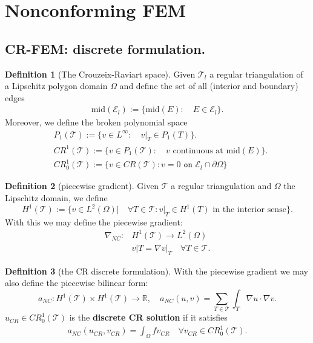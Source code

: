 \documentclass[a4paper,12pt,oneside,fleqn]{book}
\theoremstyle{definition}
\newtheorem{definition}{Definition}[section]
\theoremstyle{remark}
\begin{document}
\section{Nonconforming FEM}
\subsection{CR-FEM: discrete formulation.}
\begin{definition}[The Crouzeix-Raviart space]
	Given $\mathcal{T}_l$ a regular triangulation of a Lipschitz polygon domain $\Omega$ and define the set of all (interior and boundary) edges
	\begin{align*}
		\text{mid}(\mathcal{E}_l) := \{ \text{mid}(E): \quad E \in \mathcal{E}_l \}.
	\end{align*}
	Moreover, we define the broken polynomial space
	\begin{align*}
		&P_1(\mathcal{T}):= \{v \in L^\infty:\quad v|_T \in P_1(T)\}. \\
		&CR^1(\mathcal{T}):= \{v \in P_1(\mathcal{T}): \quad v \text{ continuous at mid}(E) \}.\\
		&CR^1_0(\mathcal{T}):= \{v \in CR(\mathcal{T}): v = 0 \texttt{ on } \mathcal{E}_l \cap \partial\Omega \}
	\end{align*}
\end{definition}


\begin{definition}[piecewise gradient]
	Given $\mathcal{T}$ a regular triangulation and $\Omega$ the Lipschitz domain, we define
	\begin{equation}
		H^1(\mathcal{T}):= \{ v \in L^2(\Omega)| \quad \forall T \in \mathcal{T}: v|_T \in H^1(T) \text{ in the interior sense} \}.
	\end{equation}
	With this we may define the piecewise gradient:
	\begin{equation}
	\begin{aligned}
		\nabla_{NC}: & H^1(\mathcal{T}) \rightarrow L^2(\Omega)\\
		& v|T = \nabla v|_T \quad \forall T \in \mathcal{T}. 
	\end{aligned}
	\end{equation}
\end{definition}

\begin{definition}[the CR discrete formulation]
		With the piecewise gradient we may also define the piecewise bilinear form:
	\begin{equation}
		a_{NC}: H^1(\mathcal{T}) \times H^1(\mathcal{T}) \rightarrow \mathbb{R}, \quad a_{NC} (u, v) = \sum_{T \in \mathcal{T}} \int_T \nabla u \cdot \nabla v. 
	\end{equation}
	$u_{CR} \in CR_0^1(\mathcal{T}) $ is the \textbf{discrete CR solution} if it satisfies
	\begin{align*}
		a_{NC}(u_{CR}, v_{CR}) = \int_\Omega f v_{CR} \quad \forall v_{CR} \in CR_0^1(\mathcal{T}). 
	\end{align*}
\end{definition}
\end{document}
